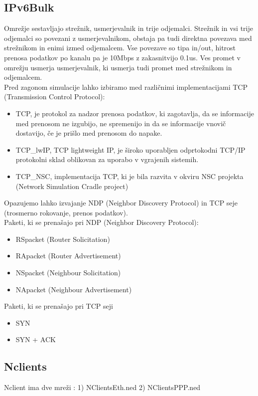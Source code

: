 \documentclass[11pt,a4paper,slovene]{myarticle}
\begin{document}
\subsection{IPv6Bulk}
Omrežje sestavljajo strežnik, usmerjevalnik in trije odjemalci. Strežnik in vsi trije odjemalci so povezani z usmerjevalnikom, obstaja pa tudi direktna povezava med strežnikom in enimi izmed odjemalcem. Vse povezave so tipa in/out, hitrost prenosa podatkov po kanalu pa je 10Mbps z zakasnitvijo 0.1us. Ves promet v omrežju usmerja usmerjevalnik, ki usmerja tudi promet med strežnikom in odjemalcem. 
\\
Pred zagonom simulacije lahko izbiramo med različnimi implementacijami TCP
(Transmission Control Protocol):
\begin{itemize}
\item TCP, je protokol za nadzor prenosa podatkov, ki zagotavlja, da se informacije med prenosom ne izgubijo, ne spremenijo in da se informacije vnovič dostavijo, če je prišlo med prenosom do napake.
\item TCP\_lwIP, TCP lightweight IP, je široko uporabljen odprtokodni TCP/IP protokolni sklad oblikovan za uporabo v vgrajenih sistemih.
\item TCP\_NSC, implementacija TCP, ki je bila razvita v okviru NSC projekta (Network Simulation Cradle project)
\end{itemize} 
Opazujemo lahko izvajanje NDP (Neighbor Discovery Protocol) in TCP seje (trosmerno rokovanje, prenos podatkov).
\\
Paketi, ki se prenašajo pri NDP (Neighbor Discovery Protocol):
\begin{itemize}
\item RSpacket (Router Solicitation)
\item RApacket (Router Advertisement)
\item NSpacket (Neighbour Solicitation)
\item NApacket (Neighbour Advertisement)
\end{itemize}
Paketi, ki se prenašajo pri TCP seji
\begin{itemize}
\item SYN
\item SYN + ACK
\end{itemize}

\subsection{Nclients}
Nclient ima dve mreži :
1) NClientsEth.ned
2) NClientsPPP.ned
\end{document}
